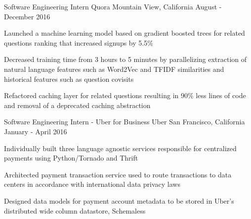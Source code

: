 \begin{cventries}
{\begin{cvitems}
      \end{cvitems}
    }
  \cventry
    {Software Engineering Intern}
    {Quora}
    {Mountain View, California}
    {August - December 2016}
    {
      \begin{cvitems}
      \item Launched a machine learning model based on gradient boosted trees for related questions ranking that increased signups by 5.5\%
      \item Decreased training time from 3 hours to 5 minutes by parallelizing extraction of natural language features such as Word2Vec and TFIDF similarities and historical features such as question covisits
      \item Refactored caching layer for related questions resulting in 90\% less lines of code and removal of a deprecated caching abstraction
      \end{cvitems}
    }
  \cventry
    {Software Engineering Intern - Uber for Business}
    {Uber}
    {San Francisco, California}
    {January - April 2016}
    {
      \begin{cvitems}
      \item Individually built three language agnostic services responsible for centralized payments using Python/Tornado and Thrift
      \item Architected payment transaction service used to route transactions to data centers in accordance with international data privacy laws
      \item Designed data models for payment account metadata to be stored in Uber's distributed wide column datastore, Schemaless

\end{cvitems}}
\end{cventries}
